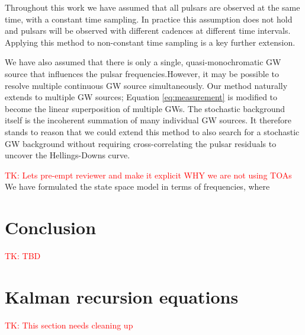 \documentclass[fleqn,usenatbib,useAMS]{mnras}
\begin{document}
Throughout this work we have assumed that all pulsars are observed at the same time, with a constant time sampling. In practice this assumption does not hold and pulsars will be observed with different cadences at different time intervals. Applying this method to non-constant time sampling is a key further extension.


We have also assumed that there is only a single, quasi-monochromatic GW source that influences the pulsar frequencies.However, it may be possible to resolve multiple continuous GW source simultaneously. Our method naturally extends to multiple GW sources; Equation \ref{eq:measurement} is modified to become the linear superposition of multiple GWs. The stochastic background itself is the incoherent summation of many individual GW sources. It therefore stands to reason that we could extend this method to also search for a stochastic GW background without requiring cross-correlating the pulsar residuals to uncover the Hellings-Downs curve. 






\textcolor{red}{TK: Lets pre-empt reviewer and make it explicit WHY we are not using TOAs}
We have formulated the state space model in terms of frequencies, where 



\section{Conclusion}

\textcolor{red}{TK: TBD}




\newpage 
\appendix

\section{Kalman recursion equations} \label{sec:kalman}




\textcolor{red}{TK: This section needs cleaning up}
\end{document}
